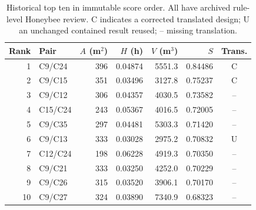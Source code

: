\begin{table}[tbp]\caption{Historical top ten in immutable score order. All have archived rule-level Honeybee review. C indicates a corrected translated design; U an unchanged contained result reused; -- missing translation.}\label{tab:historical}\centering
\small
\begin{tabular}{rlrrrrc}\toprule
Rank & Pair & $A$ (m$^2$) & $H$ (h) & $V$ (m$^3$) & $S$ & Trans.\\\midrule
1 & C9/C24 & 396 & 0.04874 & 5551.3 & 0.84486 & C\\
2 & C9/C15 & 351 & 0.03496 & 3127.8 & 0.75237 & C\\
3 & C9/C12 & 306 & 0.04357 & 4030.5 & 0.73582 & --\\
4 & C15/C24 & 243 & 0.05367 & 4016.5 & 0.72005 & --\\
5 & C9/C35 & 297 & 0.04481 & 5303.3 & 0.71420 & --\\
6 & C9/C13 & 333 & 0.03028 & 2975.2 & 0.70832 & U\\
7 & C12/C24 & 198 & 0.06228 & 4919.3 & 0.70350 & --\\
8 & C9/C21 & 333 & 0.03250 & 4252.0 & 0.70229 & --\\
9 & C9/C26 & 315 & 0.03520 & 3906.1 & 0.70170 & --\\
10 & C9/C27 & 324 & 0.03890 & 7340.9 & 0.68323 & --\\
\bottomrule\end{tabular}

\end{table}

